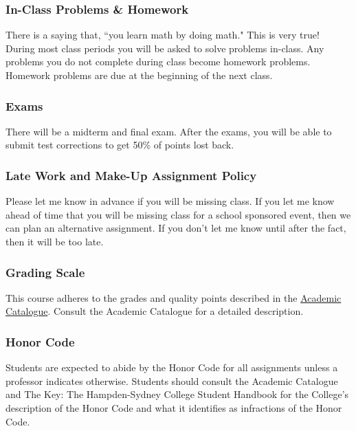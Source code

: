 \documentclass[10pt]{article}
\begin{document}
\subsubsection*{In-Class Problems \& Homework}
  
There is a saying that, ``you learn math by doing math." This is very true! During most class periods you will be asked to solve problems in-class. Any problems you do not complete during class become homework problems. Homework problems are due at the beginning of the next class.  




\subsubsection*{Exams}

There will be a midterm and final exam.  After the exams, you will be able to submit test corrections to get 50\% of points lost back.  


\subsubsection*{Late Work and Make-Up Assignment Policy}

Please let me know in advance if you will be missing class. If you let me know ahead of time that you will be missing class for a school sponsored event, then we can plan an alternative assignment. If you don't let me know until after the fact, then it will be too late.  

\subsubsection*{Grading Scale} 

This course adheres to the grades and quality points described in the \href{https://www.hsc.edu/academic-catalogues}{Academic Catalogue}. Consult the Academic Catalogue for a detailed description. 


\subsubsection*{Honor Code}

Students are expected to abide by the Honor Code for all assignments unless a professor indicates otherwise. Students should consult the Academic Catalogue and The Key: The Hampden-Sydney College Student Handbook for the College’s description of the Honor Code and what it identifies as infractions of the Honor Code.
\end{document}
